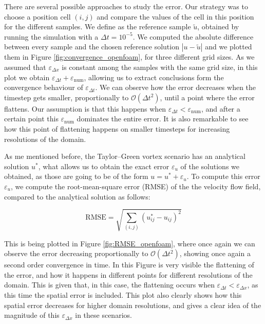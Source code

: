 \documentclass[
  english,        %
  font=times,     %
  onecolumn,      %
]{tumarticle}
\begin{document}
  


There are several possible approaches to study the error. Our strategy was to choose a position cell $(i,j)$ and compare the values of the cell in this position for the different samples. We define as the reference sample $\tilde{u}$, obtained by running the simulation with a $\Delta t = 10^{-5}$. 
We computed the absolute difference between every sample and the chosen reference solution $|u - \tilde{u}|$ and we plotted them in Figure \ref{fig:convergence_openfoam}, for three different grid sizes. As we assumed that $\varepsilon_{\Delta x}$ is constant among the samples with the same grid size, in this plot we obtain $\varepsilon_{\Delta t} + \varepsilon_\text{num}$, allowing us to extract conclusions form the convergence behaviour of $\varepsilon_{\Delta t}$. We can observe how the error decreases when the timestep gets smaller, proportionally to $\mathcal{O}(\Delta t^2)$, until a point where the error flattens. Our assumption is that this happens when $\varepsilon_{\Delta t} < \varepsilon_\text{num}$, and after a certain point this $\varepsilon_\text{num}$ dominates the entire error. It is also remarkable to see how this point of flattening happens on smaller timesteps for increasing resolutions of the domain.

As me mentioned before, the Taylor–Green vortex scenario has an analytical solution $u^*$, what allows us to obtain the exact error $\varepsilon_{u}$ of the solutions we obtained, as those are going to be of the form $u = u^* + \varepsilon_{u}$. To compute this error $\varepsilon_{u}$, we compute the root-mean-square error (RMSE) of the the velocity flow field, compared to the analytical solution as follows:  

\begin{equation}
    \text{RMSE} = \sqrt{\sum_{(i,j)} (u^*_{ij} - u_{ij})^2 }
\end{equation}

This is being plotted in Figure \ref{fig:RMSE_openfoam}, where once again we can observe the error decreasing proportionally to $\mathcal{O}(\Delta t^2)$, showing once again a second order convergence in time. In this Figure is very visible the flattening of the error, and how it happens in different points for different resolutions of the domain. This is given that, in this case, the flattening occurs when $\varepsilon_{\Delta t} < \varepsilon_{\Delta x}$, as this time the spatial error is included. This plot also clearly shows how this spatial error decreases for higher domain resolutions, and gives a clear idea of the magnitude of this $\varepsilon_{\Delta x}$ in these scenarios. 
\end{document}
